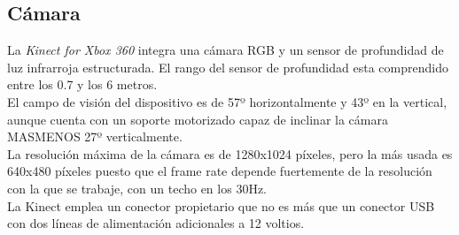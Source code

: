 \subsection{Cámara}
La \textit{Kinect for Xbox 360} integra una cámara RGB y un sensor de profundidad de luz infrarroja estructurada. El rango del sensor de profundidad esta comprendido entre los 0.7 y los 6 metros.\\
El campo de visión del dispositivo es de 57º horizontalmente y 43º en la vertical, aunque cuenta con un soporte motorizado capaz de inclinar la cámara MASMENOS 27º verticalmente. \\
La resolución máxima de la cámara es de 1280x1024 píxeles, pero la más usada es 640x480 píxeles puesto que el frame rate depende fuertemente de la resolución con la que se trabaje, con un techo en los 30Hz.\\
La Kinect emplea un conector propietario que no es más que un conector USB con dos líneas de alimentación adicionales a 12 voltios.